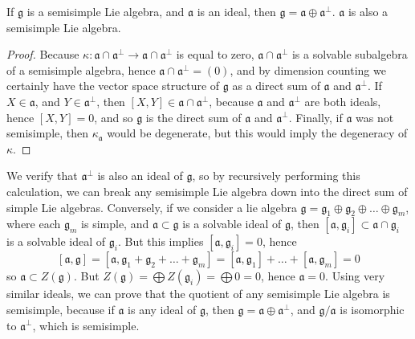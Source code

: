 \begin{lemma}
    If $\mathfrak{g}$ is a semisimple Lie algebra, and $\mathfrak{a}$ is an ideal, then $\mathfrak{g} = \mathfrak{a} \oplus \mathfrak{a}^\perp$. $\mathfrak{a}$ is also a semisimple Lie algebra.
\end{lemma}
\begin{proof}
    Because $\kappa: \mathfrak{a} \cap \mathfrak{a}^\perp \to \mathfrak{a} \cap \mathfrak{a}^\perp$ is equal to zero, $\mathfrak{a} \cap \mathfrak{a}^\perp$ is a solvable subalgebra of a semisimple algebra, hence $\mathfrak{a} \cap \mathfrak{a}^\perp = (0)$, and by dimension counting we certainly have the vector space structure of $\mathfrak{g}$ as a direct sum of $\mathfrak{a}$ and $\mathfrak{a}^\perp$. If $X \in \mathfrak{a}$, and $Y \in \mathfrak{a}^\perp$, then $[X,Y] \in \mathfrak{a} \cap \mathfrak{a}^\perp$, because $\mathfrak{a}$ and $\mathfrak{a}^\perp$ are both ideals, hence $[X,Y] = 0$, and so $\mathfrak{g}$ is the direct sum of $\mathfrak{a}$ and $\mathfrak{a}^\perp$. Finally, if $\mathfrak{a}$ was not semisimple, then $\kappa_\mathfrak{a}$ would be degenerate, but this would imply the degeneracy of $\kappa$.
\end{proof}

We verify that $\mathfrak{a}^\perp$ is also an ideal of $\mathfrak{g}$, so by recursively performing this calculation, we can break any semisimple Lie algebra down into the direct sum of simple Lie algebras. Conversely, if we consider a lie algebra $\mathfrak{g} = \mathfrak{g}_1 \oplus \mathfrak{g}_2 \oplus \dots \oplus \mathfrak{g}_m$, where each $\mathfrak{g}_m$ is simple, and $\mathfrak{a} \subset \mathfrak{g}$ is a solvable ideal of $\mathfrak{g}$, then $[\mathfrak{a}, \mathfrak{g}_i] \subset \mathfrak{a} \cap \mathfrak{g}_i$ is a solvable ideal of $\mathfrak{g}_i$. But this implies $[\mathfrak{a}, \mathfrak{g}_i] = 0$, hence
%
\[ [\mathfrak{a}, \mathfrak{g}] = [\mathfrak{a}, \mathfrak{g}_1 + \mathfrak{g}_2 + \dots + \mathfrak{g}_m] = [\mathfrak{a}, \mathfrak{g}_1] + \dots + [\mathfrak{a}, \mathfrak{g}_m] = 0 \]
%
so $\mathfrak{a} \subset Z(\mathfrak{g})$. But $Z(\mathfrak{g}) = \bigoplus Z(\mathfrak{g}_i) = \bigoplus 0 = 0$, hence $\mathfrak{a} = 0$. Using very similar ideals, we can prove that the quotient of any semisimple Lie algebra is semisimple, because if $\mathfrak{a}$ is any ideal of $\mathfrak{g}$, then $\mathfrak{g} = \mathfrak{a} \oplus \mathfrak{a}^\perp$, and $\mathfrak{g}/\mathfrak{a}$ is isomorphic to $\mathfrak{a}^\perp$, which is semisimple.

